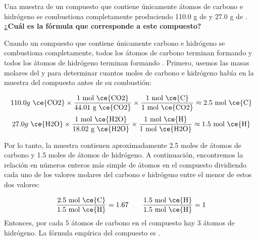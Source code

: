 Una muestra de un compuesto que contiene únicamente átomos de carbono e hidrógeno se combustiona completamente produciendo 110.0 g de  y 27.0 g de .
\textbf{¿Cuál es la fórmula que corresponde a este compuesto?}

\begin{oneparchoices}
    \choice  {}
    \choice  {}
    \CorrectChoice  {}
    \choice  {}
\end{oneparchoices}

\begin{solutionbox}{8cm}
    Cuando un compuesto que contiene únicamente carbono e hidrógeno se combustiona completamente, todos los átomos de carbono terminan formando  y todos los átomos de hidrógeno terminan formando .
    Primero, usemos las masas molares del  y  para determinar cuantos moles de carbono e hidrógeno había en la muestra del compuesto antes de su combustión:

    \[ 110.0 g \text{ \ce{CO2}} \times \frac{1 \text{ mol \ce{CO2}}}{44.01 \text{ g \ce{CO2}}} \times \dfrac{ 1 \text{ mol \ce{C}}}{1 \text{ mol \ce{CO2}}} \approx 2.5 \text{ mol \ce{C}}  \]
    \[ 27.0 g \text{ \ce{H2O}} \times \frac{1 \text{ mol \ce{H2O}}}{18.02 \text{ g \ce{H2O}}}  \times \dfrac{ 1 \text{ mol \ce{H}}}{1 \text{ mol \ce{H2O}}} \approx 1.5 \text{ mol \ce{H}} \]

    Por lo tanto, la muestra contienen aproximadamente 2.5 moles de átomos de carbono y 1.5 moles de átomos de hidrógeno.
    A continuación, encontremos la relación en números enteros más simple de átomos en el compuesto dividiendo cada uno de los valores molares del carbono e hidrógeno entre el menor de estos dos valores:

    \[ \frac{2.5 \text{ mol \ce{C}}}{1.5 \text{ mol \ce{H}}} = 1.67 \qquad \frac{1.5 \text{ mol \ce{H}}}{1.5 \text{ mol \ce{H}}} = 1 \]
    Entonces, por cada 5 átomos de carbono en el compuesto hay 3 átomos de hidrógeno.
    La fórmula empírica del compuesto es .
\end{solutionbox}